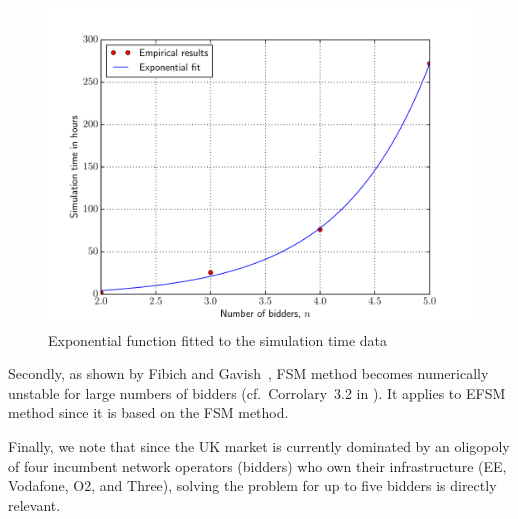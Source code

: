 \begin{figure}[t!]
  \includegraphics[width=\figsize]{Approximation/Figures/simulation_time}
  \caption{Exponential function fitted to the simulation time data}
  \label{fig:simulation_time_approximation}
\end{figure}

Secondly, as shown by Fibich and Gavish~\cite{FibichGavish2011}, FSM method becomes numerically unstable for large numbers of bidders (cf.~Corrolary~3.2 in \cite{FibichGavish2011}). It applies to EFSM method since it is based on the FSM method.

Finally, we note that since the UK market is currently dominated by an oligopoly of four incumbent network operators (bidders) who own their infrastructure (EE, Vodafone, O2, and Three), solving the problem for up to five bidders is directly relevant.

